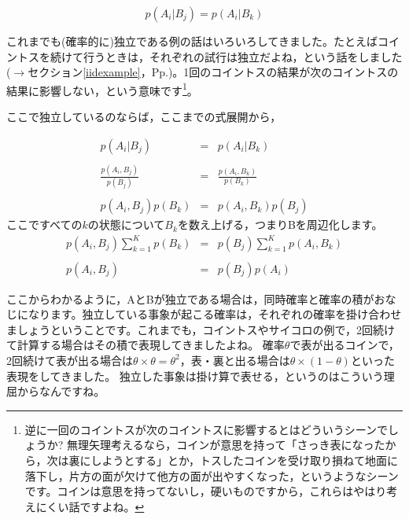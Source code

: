 \documentclass{ltjbook}
\begin{document}
\[ p(A_i|B_j) = p(A_i|B_k) \]

これまでも(確率的に)独立である例の話はいろいろしてきました。たとえばコイントスを続けて行うときは，それぞれの試行は独立だよね，という話をしました($\to$セクション\ref{iidexample}，Pp.\pageref{iidexample})。1回のコイントスの結果が次のコイントスの結果に影響しない，という意味です\footnote{逆に一回のコイントスが次のコイントスに影響するとはどういうシーンでしょうか? 無理矢理考えるなら，コインが意思を持って「さっき表になったから，次は裏にしようとする」とか，トスしたコインを受け取り損ねて地面に落下し，片方の面が欠けて他方の面が出やすくなった，というようなシーンです。コインは意思を持ってないし，硬いものですから，これらはやはり考えにくい話ですよね。}。

ここで独立しているのならば，ここまでの式展開から，

\begin{equation}
	\begin{array}{lll}
		p(A_i|B_j)               & = & p(A_i|B_k)                \\
		                          &   &                           \\
		\frac{p(A_i,B_j)}{p(B_j)} & = & \frac{p(A_i,B_k)}{p(B_k)} \\
		                          &   &                           \\
		p(A_i,B_j)p(B_k)          & = & p(A_i,B_k)p(B_j)
	\end{array}
\end{equation}
ここですべての$k$の状態について$B_k$を数え上げる，つまりBを周辺化します。
\begin{equation}
	\begin{array}{lll}
		p(A_i,B_j)\sum_{k=1}^K p(B_k) & = & p(B_j)\sum_{k=1}^K p(A_i,B_k) \\
		                              &   &                               \\
		p(A_i,B_j)                    & = & p(B_j)p(A_i)
	\end{array}
\end{equation}

ここからわかるように，AとBが独立である場合は，同時確率と確率の積がおなじになります。独立している事象が起こる確率は，それぞれの確率を掛け合わせましょうということです。これまでも，コイントスやサイコロの例で，2回続けて計算する場合はその積で表現してきましたよね。
確率$\theta$で表が出るコインで，2回続けて表が出る場合は$\theta \times \theta=\theta^2$，表・裏と出る場合は$\theta \times (1-\theta)$といった表現をしてきました。
独立した事象は掛け算で表せる，というのはこういう理屈からなんですね。
\end{document}
